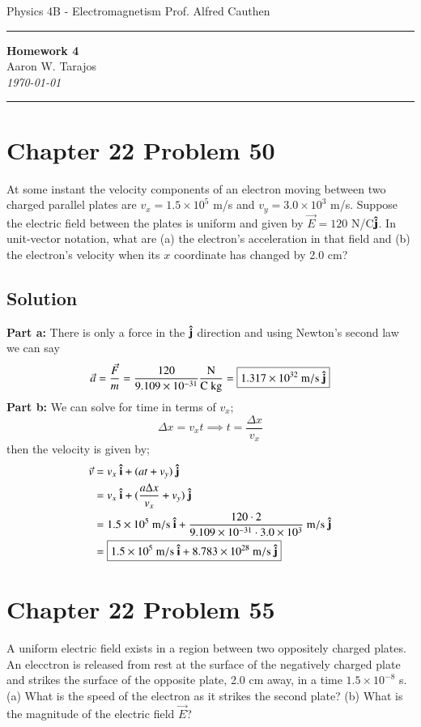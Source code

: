 \documentclass{article}
\newcommand{\g}{\text{g}}
\newcommand{\kilo}{\text{k}}
\newcommand{\m}{\text{m}}
\newcommand{\s}{\text{s}}
\newcommand{\N}{\text{N}}
\newcommand{\C}{\text{C}}
\begin{document}
\noindent
Physics 4B - Electromagnetism \hfill Prof. Alfred Cauthen

\noindent\rule{\textwidth}{0.4pt}

\begin{center}
    \textbf{\LARGE Homework 4} \\
    \vspace{12pt}
    \large Aaron W. Tarajos \\
    \textit{\today}
\end{center}

\noindent\rule{\textwidth}{0.4pt}

\section*{Chapter 22 Problem 50}
At some instant the velocity components of an electron moving between two charged parallel plates are $v_x=1.5 \times 10^5$ m/s and $v_y = 3.0 \times 10^3$ m/s. Suppose the electric field between the plates is uniform and given by $\vec{E} = 120$ N/C$\vu j$. In unit-vector notation, what are (a) the electron's acceleration in that field and (b) the electron's velocity when its $x$ coordinate has changed by 2.0 cm?

\subsection*{Solution}
\textbf{Part a:} There is only a force in the $\vu j$ direction and using Newton's second law we can say
\[
	\vec a = \frac{\vec F}{m} = \frac{120}{9.109 \times 10^{-31}} \frac{\N}{\C\ \kilo\g} = \boxed{1.317\times10^{32}\ \m/\s \ \vu j} 
\]
\textbf{Part b:} We can solve for time in terms of $v_x$;
\[
	\Delta x = v_xt \implies t = \frac{\Delta x}{v_x}
\]
then the velocity is given by;
\begin{align*}
	\vec v &= v_x\ \vu i + (at + v_y)\ \vu j \\
		   &= v_x\ \vu i + (\frac{a\Delta x}{v_x} + v_y)\ \vu j \\
		   &= 1.5 \times 10^5\ \m/\s \ \vu i + \frac{120 \cdot 2}{9.109 \times 10^{-31} \cdot 3.0 \times 10^3}\ \m/\s \ \vu j \\
		   &= \boxed{1.5 \times 10^5\ \m/\s \ \vu i + 8.783 \times 10^{28}\ \m/\s \ \vu j}
\end{align*}

\section*{Chapter 22 Problem 55}
A uniform electric field exists in a region between two oppositely charged plates. An elecctron is released from rest at the surface of the negatively charged plate and strikes the surface of the opposite plate, 2.0 cm away, in a time $1.5 \times 10^{-8}$ s. (a) What is the speed of the electron as it strikes the second plate? (b) What is the magnitude of the electric field $\vec{E}$?
\end{document}
